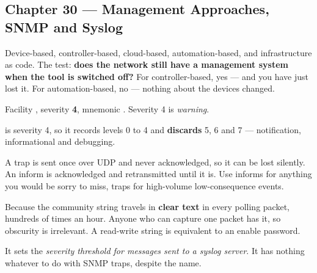 \subsection*{Chapter 30 --- Management Approaches, SNMP and Syslog}
\begin{tightnum}
  \item Device-based, controller-based, cloud-based, automation-based, and
        infrastructure as code. The test: \textbf{does the network still have a
        management system when the tool is switched off?} For controller-based,
        yes --- and you have just lost it. For automation-based, no --- nothing
        about the devices changed.
  \item Facility , severity \textbf{4}, mnemonic .
        Severity 4 is \emph{warning}.
  \item {} is severity 4, so it records levels 0 to 4 and
        \textbf{discards} 5, 6 and 7 --- notification, informational and
        debugging.
  \item A trap is sent once over UDP and never acknowledged, so it can be lost
        silently. An inform is acknowledged and retransmitted until it is.
        Use informs for anything you would be sorry to miss, traps for
        high-volume low-consequence events.
  \item Because the community string travels in \textbf{clear text} in every
        polling packet, hundreds of times an hour. Anyone who can capture one
        packet has it, so obscurity is irrelevant. A read-write string is
        equivalent to an enable password.
  \item It sets the \emph{severity threshold for messages sent to a syslog
        server}. It has nothing whatever to do with SNMP traps, despite the name.
\end{tightnum}

